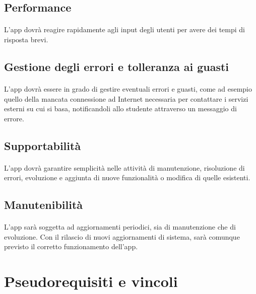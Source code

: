 \subsection{Performance}
\paragraph{}
L’app dovrà reagire rapidamente agli input degli utenti per avere dei tempi di risposta brevi.

\subsection{Gestione degli errori e tolleranza ai guasti}
\paragraph{}
L’app dovrà essere in grado di gestire eventuali errori e guasti, come ad esempio quello della mancata connessione ad Internet necessaria per contattare i servizi esterni su cui si basa, notificandoli allo studente attraverso un messaggio di errore. 

\subsection{Supportabilità}
\paragraph{}
L’app dovrà garantire semplicità nelle attività di manutenzione, risoluzione di errori, evoluzione e aggiunta di nuove funzionalità o modifica di quelle esistenti.

\subsection{Manutenibilità}
\paragraph{}
L’app sarà soggetta ad aggiornamenti periodici, sia di manutenzione che di evoluzione. Con il rilascio di nuovi aggiornamenti di sistema, sarà comunque previsto il corretto funzionamento dell’app. 

\section{Pseudorequisiti e vincoli}

